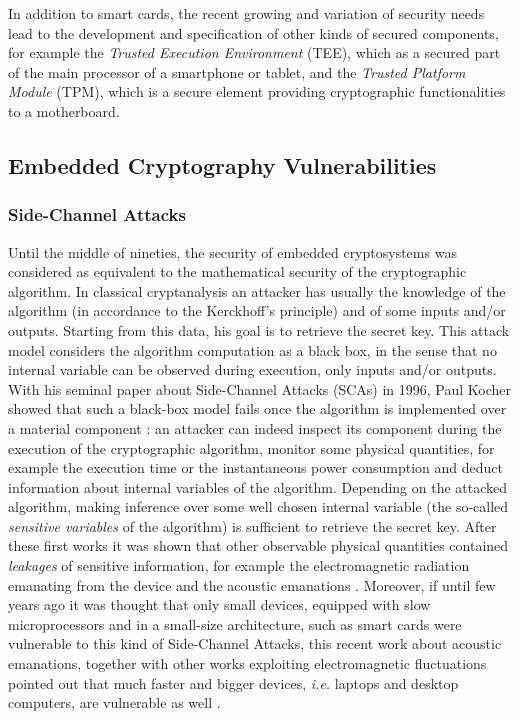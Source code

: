 In addition to smart cards, the recent growing and variation of security needs lead to the development and specification of other kinds of secured components, for example the \emph{Trusted Execution Environment} (TEE), which as a secured part of the main processor of a smartphone or tablet, and the \emph{Trusted Platform Module} 
(TPM), which is a secure element providing cryptographic functionalities to a motherboard. 

\subsection{Embedded Cryptography Vulnerabilities}\label{sec:vulnerabilities}
\subsubsection{Side-Channel Attacks}
Until the middle of nineties, the security of embedded cryptosystems was considered as equivalent to the mathematical security of the cryptographic algorithm. In classical cryptanalysis an attacker has usually the knowledge of the algorithm (in accordance to the Kerckhoff's principle) and of some inputs and/or outputs. Starting from this data, his goal is to retrieve the secret key. This attack model considers the algorithm computation as a black box, in the sense that no internal variable can be observed during execution, only inputs and/or outputs. With his seminal paper about Side-Channel Attacks (SCAs) in 1996, Paul Kocher showed that such a black-box model fails once the algorithm is implemented over a material component \cite{kocher1996timing}: an attacker can indeed inspect its component during the execution of the cryptographic algorithm, monitor some physical quantities, for example the execution time \cite{kocher1996timing} or the instantaneous power consumption \cite{kocher1999differential} and deduct information about internal variables of the algorithm. Depending on the attacked algorithm, making inference over some well chosen internal variable (the so-called \emph{sensitive variables} of the algorithm) is sufficient to retrieve the secret key. After these first works it was shown that other observable physical quantities contained \emph{leakages} of sensitive information, for example the electromagnetic radiation emanating from the device \cite{gandolfi2001electromagnetic,quisquater2001electromagnetic} and the acoustic emanations \cite{genkin2014rsa}. Moreover, if until few years ago it was thought that only small devices, equipped with slow microprocessors and in a small-size architecture, such as smart cards were vulnerable to this kind of Side-Channel Attacks, this recent work about acoustic emanations, together with other works exploiting electromagnetic fluctuations pointed out that much faster and bigger devices, \emph{i.e.} laptops and desktop computers, are vulnerable as well \cite{genkin2015stealing,genkin2015get,genkin2016ecdh}.

